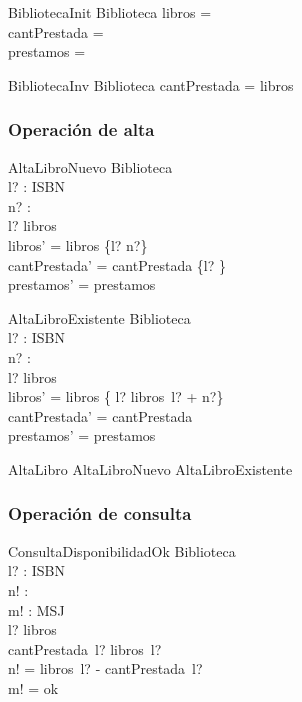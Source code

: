 \documentclass{article}
\begin{document}
\begin{schema}{BibliotecaInit}
Biblioteca
\where
libros = \emptyset \\
cantPrestada = \emptyset \\
prestamos = \emptyset
\end{schema}

\begin{schema}{BibliotecaInv}
Biblioteca
\where
\dom cantPrestada = \dom libros
\end{schema}

\subsubsection*{Operación de alta}

\begin{schema}{AltaLibroNuevo}
\Delta Biblioteca \\
l? : ISBN \\ 
n? : \nat \\
\where
l? \notin \dom libros \\
libros' = libros \cup \{l? \mapsto n?\} \\
cantPrestada' = cantPrestada \cup \{l? \} \\
prestamos' = prestamos
\end{schema}

\begin{schema}{AltaLibroExistente}
\Delta Biblioteca \\
l? : ISBN \\ 
n? : \nat \\
\where
l? \in \dom libros \\
libros' = libros \oplus \{ l? \mapsto libros~l? + n?\}\\
cantPrestada' = cantPrestada \\
prestamos' = prestamos
\end{schema}

\begin{zed}
AltaLibro  AltaLibroNuevo \lor AltaLibroExistente
\end{zed}

\subsubsection*{Operación de consulta}

\begin{schema}{ConsultaDisponibilidadOk}
\Xi Biblioteca \\
l? : ISBN \\ 
n! : \nat \\
m! : MSJ \\
\where 
l? \in \dom libros \\
cantPrestada~l? \leq libros~l? \\
n! = libros~l? - cantPrestada~l? \\
m! = ok
\end{schema}
\end{document}
